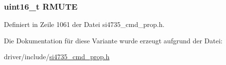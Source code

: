 \subsubsection[{R\+M\+U\+T\+E}]{\setlength{\rightskip}{0pt plus 5cm}uint16\+\_\+t R\+M\+U\+T\+E}\label{unionrx__hard__mute_a21b48010c5f26c6dc60ad46364bc10a0}


Definiert in Zeile 1061 der Datei si4735\+\_\+cmd\+\_\+prop.\+h.



Die Dokumentation für diese Variante wurde erzeugt aufgrund der Datei\+:\begin{DoxyCompactItemize}
\item 
driver/include/\hyperlink{si4735__cmd__prop_8h}{si4735\+\_\+cmd\+\_\+prop.\+h}\end{DoxyCompactItemize}
